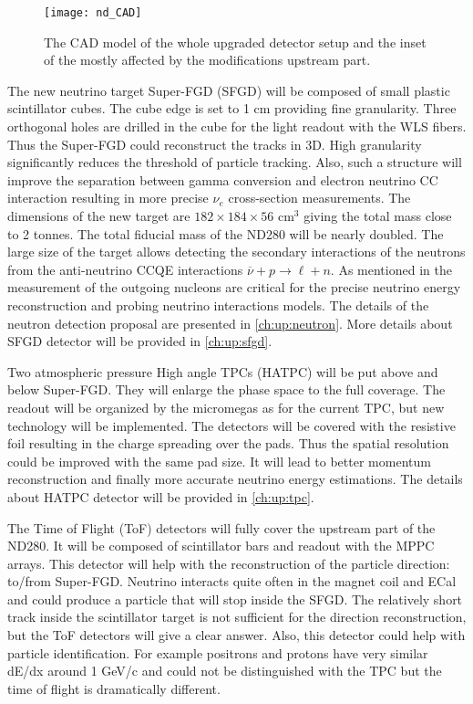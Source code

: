 \documentclass[../main.tex]{subfiles}
\begin{document}
\begin{figure}[!ht]
  \centering
  \texttt{[image: nd\_CAD]}
  \caption{The CAD model of the whole upgraded detector setup and the inset of the mostly affected by the modifications upstream part.}
  \label{fig:up:nd_cad}
\end{figure}

The new neutrino target Super-FGD (SFGD) will be composed of small plastic scintillator cubes. The cube edge is set to 1 cm providing fine granularity. Three orthogonal holes are drilled in the cube for the light readout with the WLS fibers. Thus the Super-FGD could reconstruct the tracks in 3D. High granularity significantly reduces the threshold of particle tracking. Also, such a structure will improve the separation between gamma conversion and electron neutrino CC interaction resulting in more precise $\nu_e$ cross-section measurements. The dimensions of the new target are $182\times184\times56 \text{ cm}^3$ giving the total mass close to 2 tonnes. The total fiducial mass of the ND280 will be nearly doubled. The large size of the target allows detecting the secondary interactions of the neutrons from the anti-neutrino CCQE interactions $\overline{\nu}+p\to\ell+n$. As mentioned in the  measurement of the outgoing nucleons are critical for the precise neutrino energy reconstruction and probing neutrino interactions models. The details of the neutron detection proposal are presented in \autoref{ch:up:neutron}. More details about SFGD detector will be provided in \autoref{ch:up:sfgd}.

Two atmospheric pressure High angle TPCs (HATPC) will be put above and below Super-FGD. They will enlarge the phase space to the full coverage. The readout will be organized by the micromegas as for the current TPC, but new technology will be implemented. The detectors will be covered with the resistive foil resulting in the charge spreading over the pads. Thus the spatial resolution could be improved with the same pad size. It will lead to better momentum reconstruction and finally more accurate neutrino energy estimations. The details about HATPC detector will be provided in \autoref{ch:up:tpc}.

The Time of Flight (ToF) detectors will fully cover the upstream part of the ND280. It will be composed of scintillator bars and readout with the MPPC arrays. This detector will help with the reconstruction of the particle direction: to/from Super-FGD. Neutrino interacts quite often in the magnet coil and ECal and could produce a particle that will stop inside the SFGD. The relatively short track inside the scintillator target is not sufficient for the direction reconstruction, but the ToF detectors will give a clear answer. Also, this detector could help with particle identification. For example positrons and protons have very similar dE/dx around 1 GeV/c and could not be distinguished with the TPC but the time of flight is dramatically different.
\end{document}
